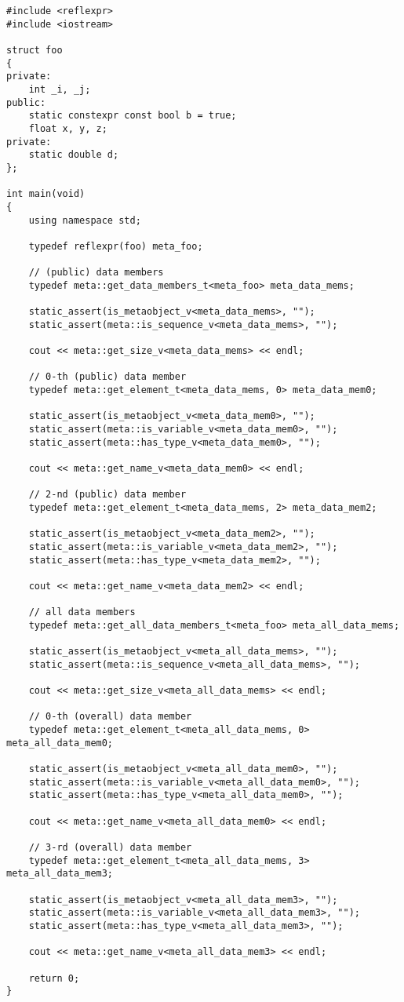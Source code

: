 \begin{verbatim}
#include <reflexpr>
#include <iostream>

struct foo
{
private:
	int _i, _j;
public:
	static constexpr const bool b = true;
	float x, y, z;
private:
	static double d;
};

int main(void)
{
	using namespace std;

	typedef reflexpr(foo) meta_foo;

	// (public) data members
	typedef meta::get_data_members_t<meta_foo> meta_data_mems;

	static_assert(is_metaobject_v<meta_data_mems>, "");
	static_assert(meta::is_sequence_v<meta_data_mems>, "");

	cout << meta::get_size_v<meta_data_mems> << endl;

	// 0-th (public) data member
	typedef meta::get_element_t<meta_data_mems, 0> meta_data_mem0;

	static_assert(is_metaobject_v<meta_data_mem0>, "");
	static_assert(meta::is_variable_v<meta_data_mem0>, "");
	static_assert(meta::has_type_v<meta_data_mem0>, "");

	cout << meta::get_name_v<meta_data_mem0> << endl;

	// 2-nd (public) data member
	typedef meta::get_element_t<meta_data_mems, 2> meta_data_mem2;

	static_assert(is_metaobject_v<meta_data_mem2>, "");
	static_assert(meta::is_variable_v<meta_data_mem2>, "");
	static_assert(meta::has_type_v<meta_data_mem2>, "");

	cout << meta::get_name_v<meta_data_mem2> << endl;

	// all data members
	typedef meta::get_all_data_members_t<meta_foo> meta_all_data_mems;

	static_assert(is_metaobject_v<meta_all_data_mems>, "");
	static_assert(meta::is_sequence_v<meta_all_data_mems>, "");

	cout << meta::get_size_v<meta_all_data_mems> << endl;

	// 0-th (overall) data member
	typedef meta::get_element_t<meta_all_data_mems, 0> meta_all_data_mem0;

	static_assert(is_metaobject_v<meta_all_data_mem0>, "");
	static_assert(meta::is_variable_v<meta_all_data_mem0>, "");
	static_assert(meta::has_type_v<meta_all_data_mem0>, "");

	cout << meta::get_name_v<meta_all_data_mem0> << endl;

	// 3-rd (overall) data member
	typedef meta::get_element_t<meta_all_data_mems, 3> meta_all_data_mem3;

	static_assert(is_metaobject_v<meta_all_data_mem3>, "");
	static_assert(meta::is_variable_v<meta_all_data_mem3>, "");
	static_assert(meta::has_type_v<meta_all_data_mem3>, "");

	cout << meta::get_name_v<meta_all_data_mem3> << endl;

	return 0;
}

\end{verbatim}

